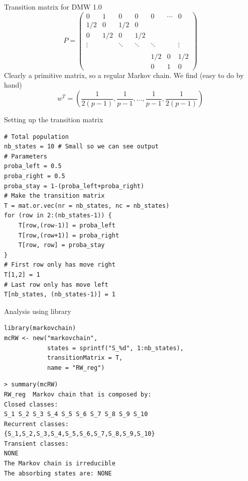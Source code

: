 \documentclass[aspectratio=169]{beamer}
\begin{document}
\begin{frame}{Transition matrix for DMW 1.0}
    $$
    P=\begin{pmatrix}
    0 & 1 & 0 & 0 & 0 & \cdots & 0\\
    1/2 & 0 & 1/2 & 0 & & & \\
    0 & 1/2 & 0 & 1/2 & & & \\
    \vdots & & \ddots & \ddots & \ddots & & \vdots \\
    & & & & & & \\
    & & & & 1/2 & 0 & 1/2 \\
    & & & & 0 & 1 & 0
    \end{pmatrix}
    $$
    Clearly a primitive matrix, so a regular Markov chain. We find (easy to do by hand)
    $$
    w^T=\left(\frac{1}{2(p-1)},\frac{1}{p-1},\ldots,\frac{1}{p-1},\frac{1}{2(p-1)}\right)
    $$    
\end{frame}


\begin{frame}[fragile]{Setting up the transition matrix}
\begin{lstlisting}[language=Renhanced]
# Total population
nb_states = 10 # Small so we can see output
# Parameters
proba_left = 0.5
proba_right = 0.5
proba_stay = 1-(proba_left+proba_right)
# Make the transition matrix
T = mat.or.vec(nr = nb_states, nc = nb_states)
for (row in 2:(nb_states-1)) {
    T[row,(row-1)] = proba_left
    T[row,(row+1)] = proba_right
    T[row, row] = proba_stay
}
# First row only has move right
T[1,2] = 1
# Last row only has move left
T[nb_states, (nb_states-1)] = 1
\end{lstlisting}
\end{frame}

\begin{frame}[fragile]{Analysis using  library}
\begin{lstlisting}[language=Renhanced]
library(markovchain)
mcRW <- new("markovchain", 
            states = sprintf("S_%d", 1:nb_states),
            transitionMatrix = T,
            name = "RW_reg")
\end{lstlisting}
\vfill
\begin{lstlisting}
> summary(mcRW)
RW_reg  Markov chain that is composed by: 
Closed classes: 
S_1 S_2 S_3 S_4 S_5 S_6 S_7 S_8 S_9 S_10 
Recurrent classes: 
{S_1,S_2,S_3,S_4,S_5,S_6,S_7,S_8,S_9,S_10}
Transient classes: 
NONE 
The Markov chain is irreducible 
The absorbing states are: NONE
\end{lstlisting}
\end{frame}
\end{document}
